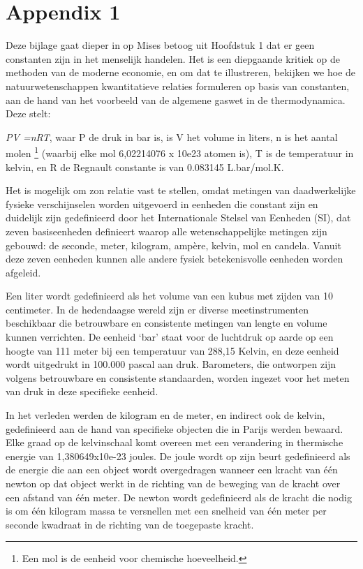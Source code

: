\documentclass[
  a5paper,
  smalldemyvopaper,11pt,twoside,onecolumn,openright,extrafontsizes,
hidelinks]{memoir}
\begin{document}

\chapter*{Appendix 1}\label{appendix-1}


Deze bijlage gaat dieper in op Mises betoog uit Hoofdstuk 1 dat er geen
constanten zijn in het menselijk handelen. Het is een diepgaande kritiek
op de methoden van de moderne economie, en om dat te illustreren,
bekijken we hoe de natuurwetenschappen kwantitatieve relaties formuleren
op basis van constanten, aan de hand van het voorbeeld van de algemene
gaswet in de thermodynamica. Deze stelt:

\emph{PV =nRT}, waar P de druk in bar is, is V het volume in liters, n
is het aantal molen \footnote{Een mol is de eenheid voor chemische
  hoeveelheid.} (waarbij elke mol 6,02214076 x 10e23 atomen is), T is de
temperatuur in kelvin, en R de Regnault constante is van 0.083145
L.bar/mol.K.

Het is mogelijk om zon relatie vast te stellen, omdat metingen van
daadwerkelijke fysieke verschijnselen worden uitgevoerd in eenheden die
constant zijn en duidelijk zijn gedefinieerd door het Internationale
Stelsel van Eenheden (SI), dat zeven basiseenheden definieert waarop
alle wetenschappelijke metingen zijn gebouwd: de seconde, meter,
kilogram, ampère, kelvin, mol en candela. Vanuit deze zeven eenheden
kunnen alle andere fysiek betekenisvolle eenheden worden afgeleid.

Een liter wordt gedefinieerd als het volume van een kubus met zijden van
10 centimeter. In de hedendaagse wereld zijn er diverse meetinstrumenten
beschikbaar die betrouwbare en consistente metingen van lengte en volume
kunnen verrichten. De eenheid `bar' staat voor de luchtdruk op aarde op
een hoogte van 111 meter bij een temperatuur van 288,15 Kelvin, en deze
eenheid wordt uitgedrukt in 100.000 pascal aan druk. Barometers, die
ontworpen zijn volgens betrouwbare en consistente standaarden, worden
ingezet voor het meten van druk in deze specifieke eenheid.

In het verleden werden de kilogram en de meter, en indirect ook de
kelvin, gedefinieerd aan de hand van specifieke objecten die in Parijs
werden bewaard. Elke graad op de kelvinschaal komt overeen met een
verandering in thermische energie van 1,380649x10e-23 joules. De joule
wordt op zijn beurt gedefinieerd als de energie die aan een object wordt
overgedragen wanneer een kracht van één newton op dat object werkt in de
richting van de beweging van de kracht over een afstand van één meter.
De newton wordt gedefinieerd als de kracht die nodig is om één kilogram
massa te versnellen met een snelheid van één meter per seconde kwadraat
in de richting van de toegepaste kracht.
\end{document}
